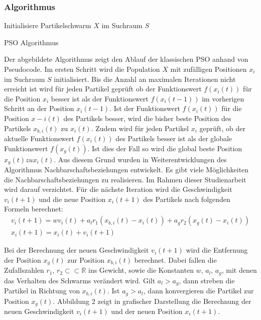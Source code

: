 \documentclass[a4paper, 11pt]{article}
\begin{document}
\subsubsection{Algorithmus}
\begin{framed}
	\begin{algorithm}[H]
		Initialisiere Partikelschwarm $X$ im Suchraum $S$\;
		\caption{PSO Algorithmus}
		\label{psoalgo}
	\end{algorithm}
\end{framed}
Der abgebildete Algorithmus zeigt den Ablauf der klassischen \acs{PSO} anhand von Pseudocode. Im ersten Schritt wird die Population $X$ mit zufälligen Positionen $x_{i}$ im Suchraum $S$ initialisiert. Bis die Anzahl an maximalen Iterationen nicht erreicht ist wird für jeden Partikel geprüft ob der Funktionswert $f(x_{i}(t))$ für die Position $x_{i}$ besser ist als der Funktionswert $f(x_{i}(t-1))$ im vorherigen Schritt an der Position $x_{i}(t-1)$. Ist der Funktionswert $f(x_{i}(t))$ für die Position $x-{i}(t)$ des Partikels besser, wird die bisher beste Position des Partikels $x_{b,i}(t)$ zu $x_{i}(t)$. Zudem wird für jeden Partikel $x_{i}$ geprüft, ob der aktuelle Funktionswert $f(x_{i}(t))$ des Partikels besser ist als der globale Funktionswert $f(x_{g}(t))$. Ist dies der Fall so wird die global beste Position $x_{g}(t) zu x_{i}(t)$. Aus diesem Grund wurden in Weiterentwicklungen des Algorithmus Nachbarschaftsbeziehungen entwickelt. Es gibt viele Möglichkeiten die Nachbarschaftsbeziehungen zu realisieren. Im Rahmen dieser Studienarbeit wird darauf verzichtet. Für die nächste Iteration wird die Geschwindigkeit $v_{i}(t+1)$ und die neue Position $x_{i}(t+1)$ des Partikels nach folgenden Formeln berechnet:
\begin{eqnarray}
v_{i}(t+1) = wv_{i}(t) + a_{l}r_{1}(x_{b,i}(t) - x_{i}(t)) + a_{g}r_{2}(x_{g}(t) - x_{i}(t)) \\
x_{i}(t+1) = x_{i}(t) + v_{i}(t+1)
\end{eqnarray}
\par Bei der Berechnung der neuen Geschwindigkeit $v_{i}(t+1)$ wird die Entfernung der Position  $x_{g}(t)$ zur Position $x_{b,i}(t)$ berechnet. Dabei fallen die Zufallszahlen $r_{1}$, $r_{2} \subset \subset \mathbb{R}$ ins Gewicht, sowie die Konstanten $w$, $a_{l}$, $a_{g}$, mit denen das Verhalten des Schwarms verändert wird. Gilt $a_{l} > a_{g}$, dann streben die Partikel in Richtung von $x_{b,i}(t)$. Ist $a_{g} > a_{l}$, dann konvergieren die Partikel zur Position $x_{g}(t)$. Abbildung 2 zeigt in grafischer Darstellung die Berechnung der neuen Geschwindigkeit $v_{i}(t+1)$ und der neuen Position $x_{i}(t+1)$.
\end{document}
